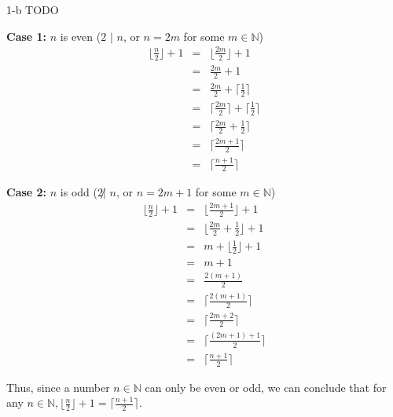 \documentclass[11pt]{article}
\begin{document}
\begin{prob}{1-b}
TODO
\end{prob}
\begin{sol}
\textbf{Case 1:} $n$ is even ($2$ $|$ $n$, or $n = 2m$ for some $m \in \mathbb{N}$) 
\begin{eqnarray*}
\Big\lfloor\frac{n}{2} \Big\rfloor + 1 & = & \Big\lfloor\frac{2m}{2} \Big\rfloor + 1\\
& = & \frac{2m}{2} + 1 \\
& = & \frac{2m}{2} + \Big\lceil\frac{1}{2}\Big\rceil \\
& = & \Big\lceil\frac{2m}{2}\Big\rceil + \Big\lceil\frac{1}{2}\Big\rceil \\
& = & \Big\lceil\frac{2m}{2} + \frac{1}{2}\Big\rceil \\
& = & \Big\lceil \frac{2m + 1}{2} \Big\rceil \\
& = & \Big\lceil\frac{n+1}{2} \Big\rceil
\end{eqnarray*}

\textbf{Case 2:} $n$ is odd ($2 \not|$  $n$, or $n = 2m + 1$ for some $m \in \mathbb{N}$) \\
\begin{eqnarray*}
\Big\lfloor\frac{n}{2}\Big\rfloor + 1 & = & \Big\lfloor\frac{2m+1}{2}\Big\rfloor + 1 \\
& = & \Big\lfloor\frac{2m}{2} + \frac{1}{2}\Big\rfloor + 1 \\
& = & m + \Big\lfloor\frac{1}{2}\Big\rfloor + 1 \\
& = & m + 1 \\
& = & \frac{2(m+1)}{2} \\
& = & \Big\lceil\frac{2(m+1)}{2}\Big\rceil \\
& = & \Big\lceil\frac{2m + 2}{2}\Big\rceil \\
& = & \Big\lceil\frac{(2m + 1) + 1}{2}\Big\rceil \\
& = & \Big\lceil\frac{n+1}{2}\Big\rceil
\end{eqnarray*}

Thus, since a number $n \in \mathbb{N}$ can only be even or odd, we can conclude that for any $n \in \mathbb{N}, \Big\lfloor\frac{n}{2}\Big\rfloor + 1 = \Big\lceil\frac{n+1}{2}\Big\rceil$.
\end{sol}
\end{document}
